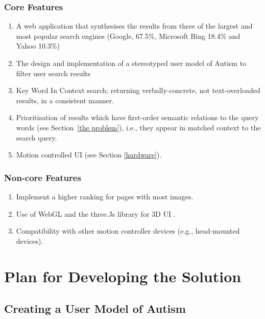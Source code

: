 \documentclass[10pt]{article}
\begin{document}
\subsubsection{Core Features}
\begin{enumerate}
\item  A web application that synthesises the results from three of the largest and most popular search engines (Google, 67.5\%, Microsoft Bing 18.4\% and Yahoo 10.3\%) \cite{adam}

\item The design and implementation of a stereotyped user model of Autism to filter user search results

\item Key Word In Context search; returning verbally-concrete, not text-overloaded results, in a consistent manner. 

\item Prioritisation of results which have first-order semantic relations to the query words (see Section~\ref{the problem}), i.e., they appear in matched context to the search query.

\item Motion controlled UI (see Section \ref{hardware}).
\end{enumerate}

\subsubsection{Non-core Features}
\begin{enumerate}

\item Implement a higher ranking for pages with most images. 
\item Use of WebGL and the three.Js library for 3D UI .
\item Compatibility with other motion controller devices (e.g., head-mounted devices).

\end{enumerate}

\section{Plan for Developing the Solution}

\subsection {Creating a User Model of Autism}\label{usermodel}
\end{document}
